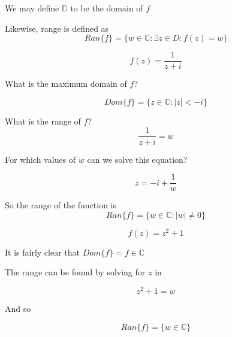 \documentclass[10pt]{article}
\begin{document}
\begin{definition}
		We may define $ \mathbb{D} $ to be the domain of $ f $ 


		Likewise, range is defined as
			\begin{equation}
				Ran\{f\} = \{ w \in \mathbb{C} : \exists z \in D : f(z) = w \}
			\end{equation}
			
\end{definition}

\begin{example}
	\begin{equation}
		f(z) = \frac{1}{z+i}
	\end{equation}

	What is the maximum domain of $ f $?

	\begin{equation}
		Dom\{f\} = \{ z \in \mathbb{C} : |z| < -i \}
	\end{equation}

	What is the range of $ f $?
	\begin{equation}
		\frac{1}{z+i} = w
	\end{equation}

	For which values of $ w $ can we solve this equation?

	\begin{equation}
		z = -i + \frac{1}{w}
	\end{equation}

	So the range of the function is 
	\begin{equation}
		Ran\{f\} = \{ w \in \mathbb{C} : |w| \neq 0 \}
	\end{equation}
	
	
\end{example}


\begin{example}
	\begin{equation}
		f(z) = z^2 + 1
	\end{equation}

	It is fairly clear that $ Dom\{f\} = {f \in \mathbb{C}} $ 

	The range can be found by solving for $ z $ in

	\begin{equation}
		z^2 + 1 = w
	\end{equation}

	And so 


	\begin{equation}
		Ran\{f\} = \{ w \in \mathbb{C}\}
	\end{equation}
	
	
	
	
\end{example}
\end{document}
